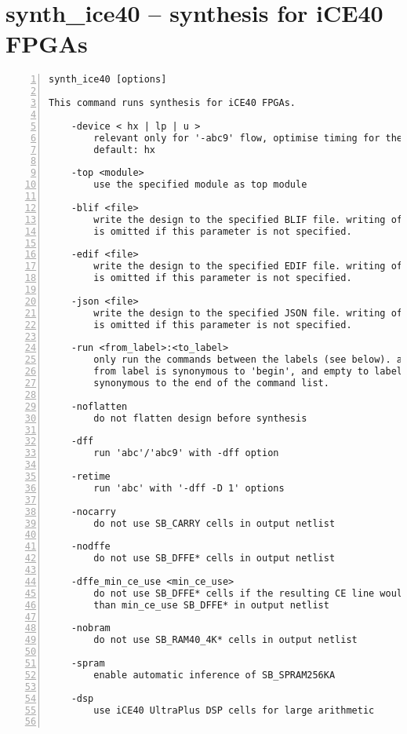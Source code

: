 \section{synth\_ice40 -- synthesis for iCE40 FPGAs}
\label{cmd:synth_ice40}
\begin{lstlisting}[numbers=left,frame=single]
    synth_ice40 [options]

This command runs synthesis for iCE40 FPGAs.

    -device < hx | lp | u >
        relevant only for '-abc9' flow, optimise timing for the specified device.
        default: hx

    -top <module>
        use the specified module as top module

    -blif <file>
        write the design to the specified BLIF file. writing of an output file
        is omitted if this parameter is not specified.

    -edif <file>
        write the design to the specified EDIF file. writing of an output file
        is omitted if this parameter is not specified.

    -json <file>
        write the design to the specified JSON file. writing of an output file
        is omitted if this parameter is not specified.

    -run <from_label>:<to_label>
        only run the commands between the labels (see below). an empty
        from label is synonymous to 'begin', and empty to label is
        synonymous to the end of the command list.

    -noflatten
        do not flatten design before synthesis

    -dff
        run 'abc'/'abc9' with -dff option

    -retime
        run 'abc' with '-dff -D 1' options

    -nocarry
        do not use SB_CARRY cells in output netlist

    -nodffe
        do not use SB_DFFE* cells in output netlist

    -dffe_min_ce_use <min_ce_use>
        do not use SB_DFFE* cells if the resulting CE line would go to less
        than min_ce_use SB_DFFE* in output netlist

    -nobram
        do not use SB_RAM40_4K* cells in output netlist

    -spram
        enable automatic inference of SB_SPRAM256KA

    -dsp
        use iCE40 UltraPlus DSP cells for large arithmetic


\end{lstlisting}
